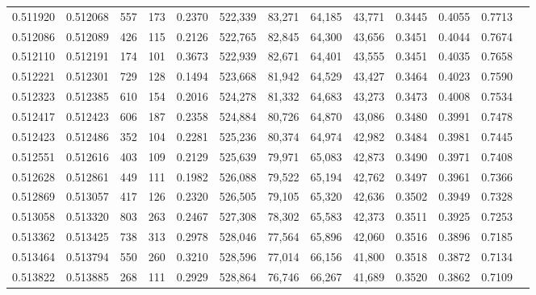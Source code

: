 \begin{tabular}{rrrrrrrrrrrrr}
0.511920 & 0.512068 &   557 &   173 &                                     0.2370 & 522,339 &  83,271 &  64,185 &  43,771 & 0.3445 & 0.4055 & 0.7713 \\
0.512086 & 0.512089 &   426 &   115 &                                     0.2126 & 522,765 &  82,845 &  64,300 &  43,656 & 0.3451 & 0.4044 & 0.7674 \\
0.512110 & 0.512191 &   174 &   101 &                                     0.3673 & 522,939 &  82,671 &  64,401 &  43,555 & 0.3451 & 0.4035 & 0.7658 \\
0.512221 & 0.512301 &   729 &   128 &                                     0.1494 & 523,668 &  81,942 &  64,529 &  43,427 & 0.3464 & 0.4023 & 0.7590 \\
0.512323 & 0.512385 &   610 &   154 &                                     0.2016 & 524,278 &  81,332 &  64,683 &  43,273 & 0.3473 & 0.4008 & 0.7534 \\
0.512417 & 0.512423 &   606 &   187 &                                     0.2358 & 524,884 &  80,726 &  64,870 &  43,086 & 0.3480 & 0.3991 & 0.7478 \\
0.512423 & 0.512486 &   352 &   104 &                                     0.2281 & 525,236 &  80,374 &  64,974 &  42,982 & 0.3484 & 0.3981 & 0.7445 \\
0.512551 & 0.512616 &   403 &   109 &                                     0.2129 & 525,639 &  79,971 &  65,083 &  42,873 & 0.3490 & 0.3971 & 0.7408 \\
0.512628 & 0.512861 &   449 &   111 &                                     0.1982 & 526,088 &  79,522 &  65,194 &  42,762 & 0.3497 & 0.3961 & 0.7366 \\
0.512869 & 0.513057 &   417 &   126 &                                     0.2320 & 526,505 &  79,105 &  65,320 &  42,636 & 0.3502 & 0.3949 & 0.7328 \\
0.513058 & 0.513320 &   803 &   263 &                                     0.2467 & 527,308 &  78,302 &  65,583 &  42,373 & 0.3511 & 0.3925 & 0.7253 \\
0.513362 & 0.513425 &   738 &   313 &                                     0.2978 & 528,046 &  77,564 &  65,896 &  42,060 & 0.3516 & 0.3896 & 0.7185 \\
0.513464 & 0.513794 &   550 &   260 &                                     0.3210 & 528,596 &  77,014 &  66,156 &  41,800 & 0.3518 & 0.3872 & 0.7134 \\
0.513822 & 0.513885 &   268 &   111 &                                     0.2929 & 528,864 &  76,746 &  66,267 &  41,689 & 0.3520 & 0.3862 & 0.7109 \\

\end{tabular}
